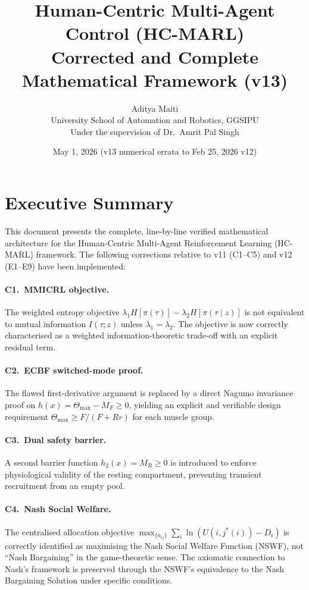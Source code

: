 \documentclass[11pt,a4paper]{article}
\title{Human-Centric Multi-Agent Control (HC-MARL)\\
       \large Corrected and Complete Mathematical Framework (v13)}
\author{Aditya Maiti\\
        University School of Automation and Robotics, GGSIPU\\
        Under the supervision of Dr.\ Amrit Pal Singh}
\date{May 1, 2026 (v13 numerical errata to Feb 25, 2026 v12)}
\begin{document}
\maketitle

\section{Executive Summary}

This document presents the complete, line-by-line verified mathematical
architecture for the Human-Centric Multi-Agent Reinforcement Learning
(HC-MARL) framework. The following corrections relative to v11 (C1--C5)
and v12 (E1--E9) have been implemented:

\paragraph{C1.\ MMICRL objective.} The weighted entropy objective
$\lambda_1 H[\pi(\tau)] - \lambda_2 H[\pi(\tau\mid z)]$ is not
equivalent to mutual information $I(\tau;z)$ unless $\lambda_1 =
\lambda_2$. The objective is now correctly characterised as a weighted
information-theoretic trade-off with an explicit residual term.

\paragraph{C2.\ ECBF switched-mode proof.} The flawed first-derivative
argument is replaced by a direct Nagumo invariance proof on $h(x) =
\Theta_{\max} - M_F \geq 0$, yielding an explicit and verifiable design
requirement $\Theta_{\max} \geq F/(F + Rr)$ for each muscle group.

\paragraph{C3.\ Dual safety barrier.} A second barrier function $h_2(x)
= M_R \geq 0$ is introduced to enforce physiological validity of the
resting compartment, preventing transient recruitment from an empty
pool.

\paragraph{C4.\ Nash Social Welfare.} The centralised allocation
objective $\max_{\{a_{ij}\}} \sum_i \ln(U(i, j^*(i)) - D_i)$ is
correctly identified as maximising the Nash Social Welfare Function
(NSWF), not ``Nash Bargaining'' in the game-theoretic sense. The
axiomatic connection to Nash's framework is preserved through the
NSWF's equivalence to the Nash Bargaining Solution under specific
conditions.
\end{document}
